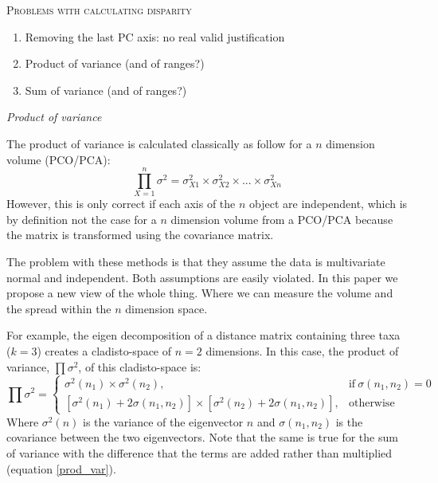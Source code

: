 \documentclass[12pt,letterpaper]{article}
\renewcommand{\section}[1]{%
\bigskip
\begin{center}
\begin{Large}
\normalfont\scshape #1
\medskip
\end{Large}
\end{center}}
\renewcommand{\subsection}[1]{%
\bigskip
\begin{center}
\begin{large}
\normalfont\itshape #1
\end{large}
\end{center}}
\begin{document}
\section{Problems with calculating disparity}

\begin{enumerate}
\item{Removing the last PC axis: no real valid justification}
\item{Product of variance (and of ranges?)}
\item{Sum of variance (and of ranges?)}
\end{enumerate}

\subsection{Product of variance}

The product of variance is calculated classically \cite{Wills1994} as follow for a $n$ dimension volume (PCO/PCA):
\begin{equation}
\prod\limits_{X=1}^n \sigma^2 = \sigma_{X1}^2 \times \sigma_{X2}^2 \times ... \times \sigma_{Xn}^2
\end{equation}
However, this is only correct if each axis of the $n$ object are independent, which is by definition not the case for a $n$ dimension volume from a PCO/PCA because the matrix is transformed using the covariance matrix. %

The problem with these methods is that they assume the data is multivariate normal and independent. Both assumptions are easily violated. In this paper we propose a new view of the whole thing. Where we can measure the volume and the spread within the $n$ dimension space.

For example, the eigen decomposition of a distance matrix containing three taxa ($k=3$) creates a cladisto-space of $n=2$ dimensions.
In this case, the product of variance, $\prod\sigma^2$, of this cladisto-space is:
\begin{equation} %
   \prod\sigma^2=
   \begin{cases}
     \sigma^2(n_1) \times \sigma^2(n_2), & \text{if}\ \sigma(n_1,n_2)=0 \\
     [\sigma^2(n_1)+2\sigma(n_1,n_2)] \times [\sigma^2(n_2)+2\sigma(n_1,n_2)], & \text{otherwise}
   \end{cases}
   \label{prod_var}
\end{equation}
Where $\sigma^2(n)$ is the variance of the eigenvector $n$ and $\sigma(n_{1}, n_{2})$ is the covariance between the two eigenvectors.
Note that the same is true for the sum of variance with the difference that the terms are added rather than multiplied (equation \ref{prod_var}).
\end{document}
